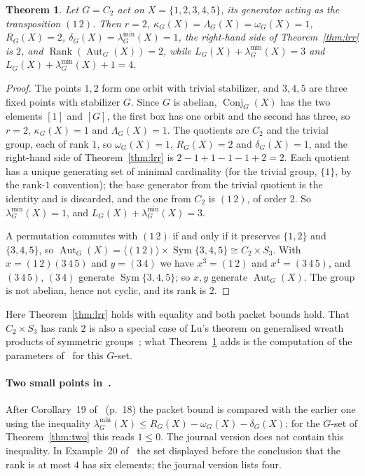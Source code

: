 \documentclass[11pt]{article}
\newtheorem{theorem}{Theorem}
\theoremstyle{remark}
\newcommand{\Rank}{\operatorname{Rank}}
\newcommand{\Aut}{\operatorname{Aut}}
\newcommand{\Conj}{\operatorname{Conj}}
\newcommand{\Sym}{\operatorname{Sym}}
\newcommand{\lmin}{\lambda^{\min}}
\begin{document}
\begin{theorem}\label{thm:five}
Let $G=C_2$ act on $X=\{1,2,3,4,5\}$, its generator acting as the
transposition $(1\,2)$. Then $r=2$, $\kappa_G(X)=\Lambda_G(X)=\omega_G(X)=1$,
$R_G(X)=2$, $\delta_G(X)=\lmin_G(X)=1$, the right-hand side of
Theorem~\ref{thm:lrr} is $2$, and $\Rank(\Aut_G(X))=2$,
while $L_G(X)+\lmin_G(X)=3$ and $L_G(X)+\lmin_G(X)+1=4$.
\end{theorem}

\begin{proof}
The points $1,2$ form one orbit with trivial stabilizer, and $3,4,5$ are three
fixed points with stabilizer $G$. Since $G$ is abelian, $\Conj_G(X)$ has the
two elements $[1]$ and $[G]$, the first box has one orbit and the second
has three, so $r=2$, $\kappa_G(X)=1$ and $\Lambda_G(X)=1$. The quotients are
$C_2$ and the trivial group, each of rank $1$, so $\omega_G(X)=1$,
$R_G(X)=2$ and $\delta_G(X)=1$, and the right-hand side of
Theorem~\ref{thm:lrr} is $2-1+1-1-1+2=2$. Each quotient has a unique generating
set of minimal cardinality (for the trivial group, $\{1\}$, by the rank-$1$
convention); the base generator from the trivial quotient is the identity
and is discarded, and the one from $C_2$ is $(1\,2)$, of order $2$. So
$\lmin_G(X)=1$, and $L_G(X)+\lmin_G(X)=3$.

A permutation commutes with $(1\,2)$ if and only if it preserves $\{1,2\}$
and $\{3,4,5\}$, so $\Aut_G(X)=\langle(1\,2)\rangle\times\Sym\{3,4,5\}\cong
C_2\times S_3$. With $x=(1\,2)(3\,4\,5)$ and $y=(3\,4)$ we have
$x^3=(1\,2)$ and $x^4=(3\,4\,5)$, and $(3\,4\,5)$, $(3\,4)$ generate
$\Sym\{3,4,5\}$; so $x,y$ generate $\Aut_G(X)$. The group is not abelian,
hence not cyclic, and its rank is $2$.
\end{proof}

Here Theorem~\ref{thm:lrr} holds with equality and both packet bounds hold.
That $C_2\times S_3$ has rank $2$ is also a special case of Lu's theorem on
generalised wreath products of symmetric groups~\cite[Theorem~1.1 and
Lemma~3.10]{lu}; what Theorem~\ref{thm:five} adds is the computation of the
parameters of~\cite{lrr} for this $G$-set.

\paragraph{Two small points in~\cite{rlr}.} After Corollary~19 of~\cite{rlr}
(p.~18) the packet bound is compared with the earlier one using the inequality
$\lmin_G(X)\le R_G(X)-\omega_G(X)-\delta_G(X)$; for the $G$-set of
Theorem~\ref{thm:two} this reads $1\le0$. The journal version does not contain
this inequality. In Example~20 of~\cite{rlr} the set displayed before the
conclusion that the rank is at most $4$ has six elements; the journal version
lists four.
\end{document}
